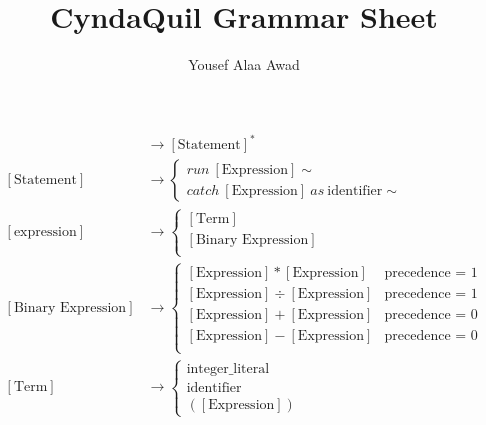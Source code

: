 \documentclass[12pt, letterpaper]{article}
\title{CyndaQuil Grammar Sheet}
\author{Yousef Alaa Awad}
\begin{document}
\maketitle
\begin{align}
  [\text{Program}] &\to [\text{Statement}]^* \\
  [\text{Statement}] &\to \begin{cases}
    run\ [\text{Expression}]\sim \\
    catch\  [\text{Expression}]\ as\ \text{identifier}\sim
  \end{cases} \\
  [\text{expression}]&\to \begin{cases}
    [\text{Term}] \\
    [\text{Binary Expression}] \\
  \end{cases} \\
  [\text{Binary Expression}] &\to \begin{cases}
    [\text{Expression}] * [\text{Expression}] & \text{precedence = 1}\\
    [\text{Expression}] \div [\text{Expression}] & \text{precedence = 1}\\
    [\text{Expression}] + [\text{Expression}] &  \text{precedence = 0}\\
    [\text{Expression}] - [\text{Expression}] &  \text{precedence = 0}\\
  \end{cases} \\
  [\text{Term}] &\to \begin{cases}
  \text{integer\_literal} \\
  \text{identifier} \\
    ([\text{Expression}])
  \end{cases}
\end{align}
\end{document}
